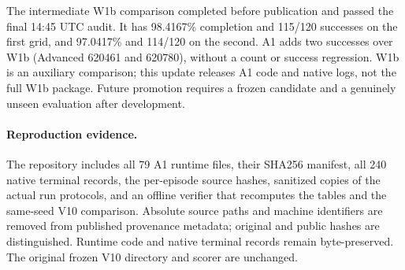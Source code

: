 The intermediate W1b comparison completed before publication and passed the final 14:45 UTC audit. It has 98.4167\% completion and 115/120 successes on the first grid, and 97.0417\% and 114/120 on the second. A1 adds two successes over W1b (Advanced 620461 and 620780), without a count or success regression. W1b is an auxiliary comparison; this update releases A1 code and native logs, not the full W1b package. Future promotion requires a frozen candidate and a genuinely unseen evaluation after development.

\paragraph{Reproduction evidence.}
The repository includes all 79 A1 runtime files, their SHA256 manifest, all 240 native terminal records, the per-episode source hashes, sanitized copies of the actual run protocols, and an offline verifier that recomputes the tables and the same-seed V10 comparison. Absolute source paths and machine identifiers are removed from published provenance metadata; original and public hashes are distinguished. Runtime code and native terminal records remain byte-preserved. The original frozen V10 directory and scorer are unchanged.
